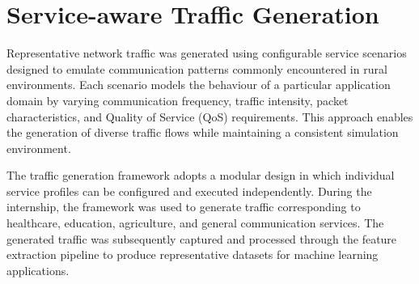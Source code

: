 \documentclass[12pt,a4paper]{report}
\begin{document}
	
	\section{Service-aware Traffic Generation}
	\label{sec:traffic_generation}
	
	Representative network traffic was generated using configurable service scenarios designed to emulate communication patterns commonly encountered in rural environments. Each scenario models the behaviour of a particular application domain by varying communication frequency, traffic intensity, packet characteristics, and Quality of Service (QoS) requirements. This approach enables the generation of diverse traffic flows while maintaining a consistent simulation environment.
	
	The traffic generation framework adopts a modular design in which individual service profiles can be configured and executed independently. During the internship, the framework was used to generate traffic corresponding to healthcare, education, agriculture, and general communication services. The generated traffic was subsequently captured and processed through the feature extraction pipeline to produce representative datasets for machine learning applications.
	

	
\end{document}
